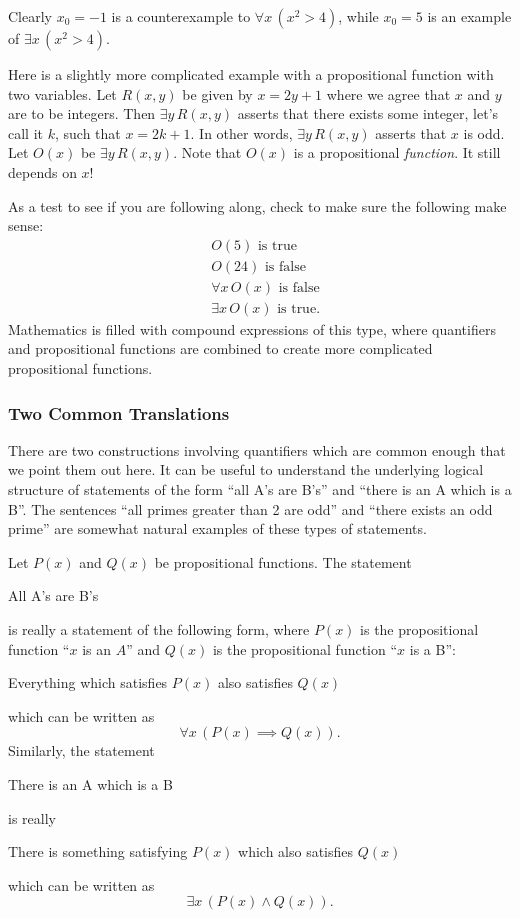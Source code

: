 \noindent Clearly $x_0 = -1$ is a counterexample to $\forall x \, (x^2>4)$, while $x_0 = 5$ is an example of $\exists x \, (x^2>4)$.

\begin{example}
Here is a slightly more complicated example with a propositional function with two variables. Let $R(x,y)$ be given by $x = 2y + 1$ where we agree that $x$ and $y$ are to be integers. Then $\exists y \, R(x,y)$ asserts that there exists some integer, let's call it $k$, such that $x = 2k + 1$. In other words, $\exists y \, R(x,y)$ asserts that $x$ is odd. Let $O(x)$ be $\exists y \, R(x,y)$. Note that $O(x)$ is a propositional \emph{function}. It still depends on $x$!

As a test to see if you are following along, check to make sure the following make sense:
\begin{align*}
    &O(5) \text{ is true} \\
    &O(24) \text{ is false} \\
    &\forall x \, O(x) \text{ is false} \\
    &\exists x \, O(x) \text{ is true}.
\end{align*}
Mathematics is filled with compound expressions of this type, where quantifiers and propositional functions are combined to create more complicated propositional functions.
\end{example}

\subsubsection*{Two Common Translations}

There are two constructions involving quantifiers which are common enough that we point them out here. It can be useful to understand the underlying logical structure of statements of the form ``all A's are B's'' and ``there is an A which is a B''. The sentences ``all primes greater than 2 are odd'' and ``there exists an odd prime'' are somewhat natural examples of these types of statements.

\begin{remark}
Let $P(x)$ and $Q(x)$ be propositional functions. The statement
\begin{center}
    All A's are B's
\end{center}
is really a statement of the following form, where $P(x)$ is the propositional function ``$x$ is an $A$'' and $Q(x)$ is the propositional function ``$x$ is a B'':
\begin{center}
    Everything which satisfies $P(x)$ also satisfies $Q(x)$
\end{center}
which can be written as
\[
\forall x \, (P(x) \implies Q(x)).
\]
Similarly, the statement 
\begin{center}
    There is an A which is a B
\end{center}
is really
\begin{center}
    There is something satisfying $P(x)$ which also satisfies $Q(x)$
\end{center}
which can be written as
\[
\exists x \, (P(x) \land Q(x)).
\]
\end{remark}

